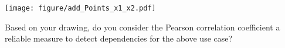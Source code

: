 {\begin{enumerate}[a)]
\begin{center}
\texttt{[image: figure/add\_Points\_x1\_x2.pdf]}
\end{center}

Based on your drawing, do you consider the Pearson correlation coefficient a reliable measure to 
detect dependencies for the above use case?

%
% 
%

\end{enumerate}
}
